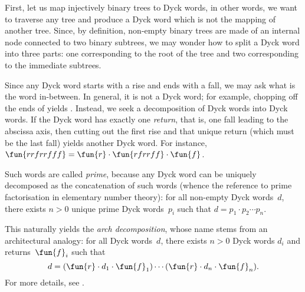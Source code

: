 First, let us map injectively binary trees to Dyck words, in other
words, we want to traverse any tree and produce a Dyck word which is
not the mapping of another tree. Since, by definition, non\hyp{}empty
binary trees are made of an internal node connected to two binary
subtrees, we may wonder how to split a Dyck word into three parts: one
corresponding to the root of the tree and two corresponding to the
immediate subtrees.

Since any Dyck word starts with a rise and ends with a fall, we may
ask what is the word in\hyp{}between. In general, it is not a Dyck
word; for example, chopping off the ends of  yields
. Instead, we seek a decomposition of Dyck words into Dyck
words. If the Dyck word has exactly one \emph{return}, that is, one
fall leading to the abscissa axis, then cutting out the first rise and
that unique return (which must be the last fall) yields another Dyck
word. For instance, \(\fun{rrfrrfff} = \fun{r} \cdot \fun{rfrrff}
\cdot \fun{f}\).

Such words are called \emph{prime}, because any Dyck word can be
uniquely decomposed as the concatenation of such words (whence the
reference to prime factorisation in elementary number theory): for all
non\hyp{}empty Dyck words~\(d\), there exists \({n > 0}\) unique prime
Dyck words~\(p_i\) such that \(d = p_1 \cdot p_2 \cdots p_n\).

This naturally yields the \emph{arch decomposition}, whose name stems from an
architectural analogy: for all Dyck words~\(d\), there exists \({n >
  0}\) Dyck words \(d_i\) and returns~\(\fun{f}_i\) such that
\begin{equation*}
d = (\fun{r} \cdot d_1 \cdot \fun{f}_1) \cdots (\fun{r} \cdot d_n
\cdot \fun{f}_n).
\end{equation*}
For more details, see \cite{PanayotopoulosSapounakis_1995,
  Lothaire_2005, FlajoletSedgewick_2009}.

